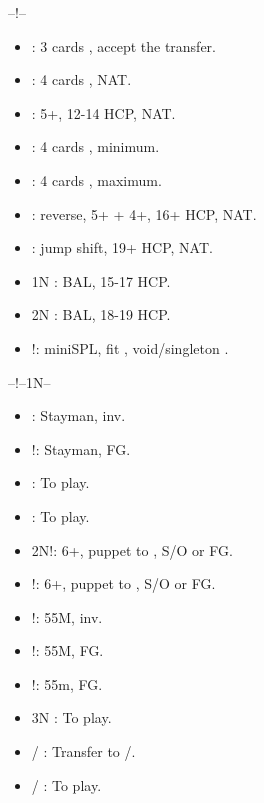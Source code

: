 \documentclass[12pt,twoside,a5paper]{report}%
\begin{document}
	--!--
	\begin{itemize}
	\renewcommand{\labelitemi}{}
	\item {} : 3 cards \he{}, accept the transfer.
	\item {} : 4 cards \sp{}, NAT.
	\item {} : 5+\cl{}, 12-14 HCP, NAT.
	\item {} : 4 cards \he{}, minimum.
	\item {} : 4 cards \he{}, maximum.
	\item {} : reverse, 5+\cl{} + 4+\di{}, 16+ HCP, NAT.
	\item {} : jump shift, 19+ HCP, NAT. 
	\item 1N : BAL, 15-17 HCP.
	\item 2N : BAL, 18-19 HCP.
	\item {}!: miniSPL, fit \he{}, void/singleton \di{}.
	\end{itemize}

	--!--1N--
	\begin{itemize}
	\renewcommand{\labelitemi}{}
	\item {} : Stayman, inv.
	\item {}!: Stayman, FG.
	\item {} : To play.
	\item {} : To play.
	\item 2N!: 6+\cl{}, puppet to , S/O or FG.
	\item {}!: 6+\di{}, puppet to , S/O or FG.
	\item {}!: 55M, inv.
	\item {}!: 55M, FG.
	\item {}!: 55m, FG.
	\item 3N : To play.
	\item {}/ : Transfer to /\sp{}.
	\item {}/ : To play.
	\end{itemize}

\end{document}
